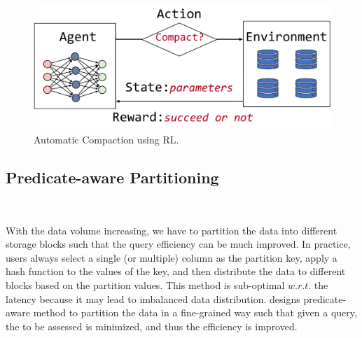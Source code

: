 \begin{figure}[htbp]
	\includegraphics[scale=0.35]{figures/rl}
	\centering
	\vspace{-1em}
	\caption{Automatic Compaction using RL.}
	\label{fig:rl}
	\vspace{-1em}
\end{figure}







\subsection{Predicate-aware Partitioning}~\label{subsec:partition}


With the data volume increasing, we  have to partition the data into different storage blocks such that the query efficiency can be much improved. In practice, users always select a single (or multiple) column as the partition key,  apply   a hash function to the values of the key, and then distribute the data to different blocks based on the partition values. This method is sub-optimal $w.r.t.$ the latency because it may lead to imbalanced data distribution. \brain  designs predicate-aware  method to partition the data in a fine-grained way such that given a query, the  to be assessed is minimized, and thus the efficiency is improved.


